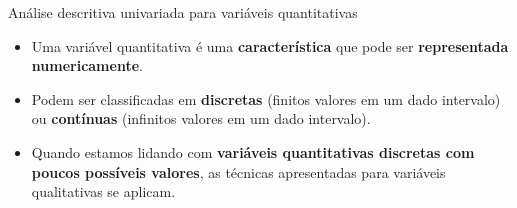 \documentclass[
  ignorenonframetext,
  serif,
  professionalfont,
  usenames,
  dvipsnames,
  aspectratio = 169]{beamer}
\begin{document}
\begin{frame}{Análise descritiva univariada para variáveis
quantitativas}
\protect\hypertarget{anuxe1lise-descritiva-univariada-para-variuxe1veis-quantitativas-1}{}
\begin{itemize}
\item
  Uma variável quantitativa é uma \textbf{característica} que pode ser
  \textbf{representada numericamente}.
\item
  Podem ser classificadas em \textbf{discretas} (finitos valores em um
  dado intervalo) ou \textbf{contínuas} (infinitos valores em um dado
  intervalo).
\item
  Quando estamos lidando com
  \textbf{variáveis quantitativas discretas com poucos possíveis valores},
  as técnicas apresentadas para variáveis qualitativas se aplicam.
\end{itemize}
\end{frame}
\end{document}
